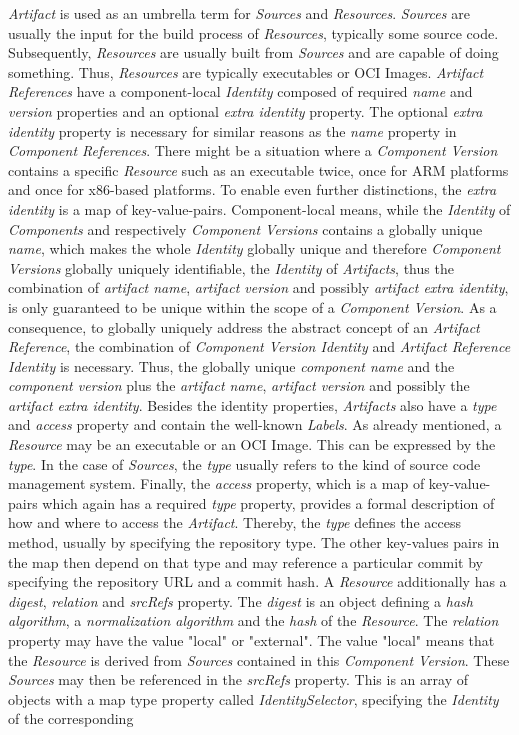 \noindent \emph{Artifact} is used as an umbrella term for \emph{Sources} and \emph{Resources}. \emph{Sources} are usually the input for the build process of \emph{Resources}, typically some source code. Subsequently, \emph{Resources} are usually built from \emph{Sources} and are capable of doing something. Thus, \emph{Resources} are typically executables or OCI Images. \emph{Artifact References} have a component-local \emph{Identity} composed of required \emph{name} and \emph{version} properties and an optional \emph{extra identity} property. The optional \emph{extra identity} property is necessary for similar reasons as the \emph{name} property in \emph{Component References}. There might be a situation where a \emph{Component Version} contains a specific \emph{Resource} such as an executable twice, once for ARM platforms and once for x86-based platforms. To enable even further distinctions, the \emph{extra identity} is a map of key-value-pairs. Component-local means, while the \emph{Identity} of \emph{Components} and respectively \emph{Component Versions} contains a globally unique \emph{name}, which makes the whole \emph{Identity} globally unique and therefore \emph{Component Versions} globally uniquely identifiable, the \emph{Identity} of \emph{Artifacts}, thus the combination of \emph{artifact name}, \emph{artifact version} and possibly \emph{artifact extra identity}, is only guaranteed to be unique within the scope of a \emph{Component Version}. As a consequence, to globally uniquely address the abstract concept of an \emph{Artifact Reference}, the combination of \emph{Component Version Identity} and \emph{Artifact Reference Identity} is necessary. Thus, the globally unique \emph{component name} and the \emph{component version} plus the \emph{artifact name}, \emph{artifact version} and possibly the \emph{artifact extra identity}. Besides the identity properties, \emph{Artifacts} also have a \emph{type} and \emph{access} property and contain the well-known \emph{Labels}. As already mentioned, a \emph{Resource} may be an executable or an OCI Image. This can be expressed by the \emph{type}. In the case of \emph{Sources}, the \emph{type} usually refers to the kind of source code management system. Finally, the \emph{access} property, which is a map of key-value-pairs which again has a required \emph{type} property, provides a formal description of how and where to access the \emph{Artifact}. Thereby, the \emph{type} defines the access method, usually by specifying the repository type. The other key-values pairs in the map then depend on that type and may reference a particular commit by specifying the repository URL and a commit hash. A \emph{Resource} additionally has a \emph{digest}, \emph{relation} and \emph{srcRefs} property. The \emph{digest} is an object defining a \emph{hash algorithm}, a \emph{normalization algorithm} and the \emph{hash} of the \emph{Resource}. The \emph{relation} property may have the value "local" or "external". The value "local" means that the \emph{Resource} is derived from \emph{Sources} contained in this \emph{Component Version}. These \emph{Sources} may then be referenced in the \emph{srcRefs} property. This is an array of objects with a map type property called \emph{IdentitySelector}, specifying the \emph{Identity} of the corresponding 